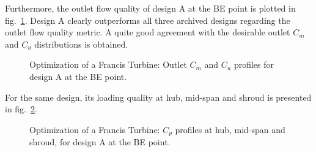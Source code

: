 Furthermore, the outlet flow quality of design A at the BE point is plotted in fig.\   \ref{Francis-A-OUT}. Design A clearly outperforms all three archived designs regarding the outlet flow quality metric. A quite good agreement  with the desirable outlet $C_m$ and $C_u$ distributions is obtained.

\begin{figure}[h!]
\begin{minipage}[b]{1\linewidth}
 \centering
\end{minipage}
\caption{Optimization of a Francis Turbine: Outlet $C_m$ and $C_u$ profiles for design A at the BE point.}
\label{Francis-A-OUT}
\end{figure}

For the same design, its loading quality at hub, mid-span and shroud is presented in fig.\  \ref{Francis-A-LOAD}.

\begin{figure}[h!]
\begin{minipage}[b]{1\linewidth}
 \centering
\end{minipage}
\caption{Optimization of a Francis Turbine: $C_p$ profiles at hub, mid-span and shroud, for design A at the BE point.}
\label{Francis-A-LOAD}
\end{figure} 

